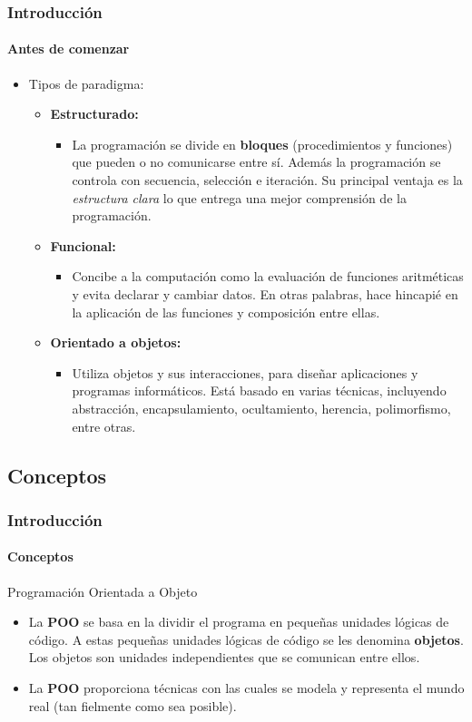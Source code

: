 \documentclass{beamer}
\begin{document}
		\begin{frame}
			\frametitle{Introducci\'on}
			\framesubtitle{Antes de comenzar}

			\begin{itemize}
  				\item Tipos de paradigma:
				\begin{itemize}
					\item \textbf{Estructurado:}
					\begin{itemize}
  						\item La programaci\'on se divide en \textbf{bloques} (procedimientos y funciones) que pueden o no comunicarse entre s\'i. Adem\'as la programaci\'on se controla con secuencia, selecci\'on e iteraci\'on. Su principal ventaja es la \emph{estructura clara} lo que entrega una mejor comprensi\'on de la programaci\'on.
					\end{itemize}
					\item \textbf{Funcional:} 
					\begin{itemize}
  						\item Concibe a la computaci\'on como la evaluaci\'on de funciones aritm\'eticas y evita declarar y cambiar datos. En otras palabras, hace hincapi\'e en la aplicaci\'on de las funciones y composici\'on entre ellas.
					\end{itemize}
					\item \textbf{Orientado a objetos:}
					\begin{itemize}
  						\item Utiliza objetos y sus interacciones, para dise\~nar aplicaciones y programas inform\'aticos. Est\'a basado en varias t\'ecnicas, incluyendo abstracci\'on, encapsulamiento, ocultamiento, herencia, polimorfismo, entre otras.
					\end{itemize}
				\end{itemize}
			\end{itemize}
		\end{frame}

	\subsection{Conceptos}

		\begin{frame}
			\frametitle{Introducci\'on}
			\framesubtitle{Conceptos}

			\begin{exampleblock}{Programaci\'on Orientada a Objeto}
				\begin{itemize}
  					\item[] La \textbf{POO} se basa en la dividir el programa en peque\~nas unidades l\'ogicas de c\'odigo. A estas peque\~nas unidades l\'ogicas de c\'odigo se les denomina \textbf{objetos}. Los objetos son unidades independientes que se comunican entre ellos.\\
					\item[] La \textbf{POO} proporciona t\'ecnicas con las cuales se modela y representa el mundo real (tan fielmente como sea posible).
				\end{itemize}
			\end{exampleblock}
		\end{frame}
\end{document}
